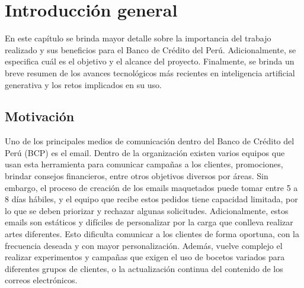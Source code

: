 
\chapter{Introducción general} %

\label{Chapter1} %
\label{IntroGeneral}


\newcommand{\keyword}[1]{\textbf{#1}}
\newcommand{\tabhead}[1]{\textbf{#1}}
\newcommand{\code}[1]{\texttt{#1}}
\newcommand{\file}[1]{\texttt{\bfseries#1}}
\newcommand{\option}[1]{\texttt{\itshape#1}}
\newcommand{\grados}{$^{\circ}$}



En este capítulo se brinda mayor detalle sobre la importancia del trabajo realizado y sus beneficios para el Banco de Crédito del Perú. Adicionalmente, se especifica cuál es el objetivo y el alcance del proyecto. Finalmente, se brinda un breve resumen de los avances tecnológicos más recientes en inteligencia artificial generativa y los retos implicados en su uso.

\section{Motivación}

Uno de los principales medios de comunicación dentro del Banco de Crédito del Perú (BCP) es el email. Dentro de la organización existen varios equipos que usan esta herramienta para comunicar campañas a los clientes, promociones, brindar consejos financieros, entre otros objetivos diversos por áreas. Sin embargo, el proceso de creación de los emails maquetados puede tomar entre 5 a 8 días hábiles, y el equipo que recibe estos pedidos tiene capacidad limitada, por lo que se deben priorizar y rechazar algunas solicitudes. Adicionalmente, estos emails son estáticos y difíciles de personalizar por la carga que conlleva realizar artes diferentes. Esto dificulta comunicar a los clientes de forma oportuna, con la frecuencia deseada y con mayor personalización. Además, vuelve complejo el realizar experimentos y campañas que exigen el uso de bocetos variados para diferentes grupos de clientes, o la actualización continua del contenido de los correos electrónicos. 

